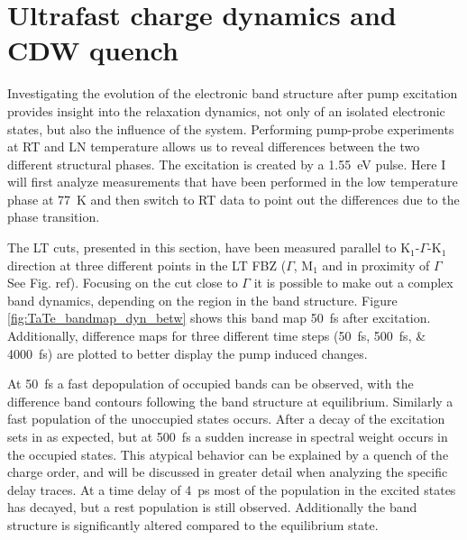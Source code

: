 \section{Ultrafast charge dynamics and CDW quench}

Investigating the evolution of the electronic band structure after pump excitation provides insight into the relaxation dynamics, not only of an isolated electronic states, but also the influence of the system.
Performing pump-probe experiments at RT and LN temperature allows us to reveal differences between the two different structural phases.
The excitation is created by a \SI{1.55}{\electronvolt} pulse.
Here I will first analyze measurements that have been performed in the low temperature phase at \SI{77}{\kelvin} and then switch to RT data to point out the differences due to the phase transition.

The LT cuts, presented in this section, have been measured parallel to K$_1$-$\Gamma$-K$_1$ direction at three different points in the LT FBZ ($\Gamma$, M$_1$ and in proximity of $\Gamma$ See Fig. ref).
Focusing on the cut close to $\Gamma$ it is possible to make out a complex band dynamics, depending on the region in the band structure.
Figure \ref{fig:TaTe_bandmap_dyn_betw} shows this band map \SI{50}{\femto\second} after excitation.
Additionally, difference maps for three different time steps (\SIlist{50; 500; 4000}{\femto\second}) are plotted to better display the pump induced changes.

At \SI{50}{\femto\second} a fast depopulation of occupied bands can be observed, with the difference band contours following the band structure at equilibrium.
Similarly a fast population of the unoccupied states occurs.
After a decay of the excitation sets in as expected, but at \SI{500}{\femto\second} a sudden increase in spectral weight occurs in the occupied states.
This atypical behavior can be explained by a quench of the charge order, and will be discussed in greater detail when analyzing the specific delay traces.
At a time delay of \SI{4}{\pico\second} most of the population in the excited states has decayed, but a rest population is still observed.
Additionally the band structure is significantly altered compared to the equilibrium state.

